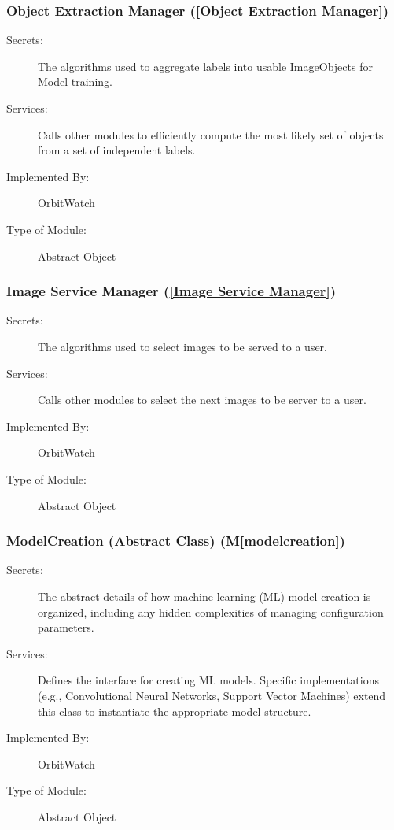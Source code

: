 \documentclass[12pt, titlepage]{article}
\newcommand{\mref}[1]{M\ref{#1}}
\begin{document}
\subsubsection{Object Extraction Manager (\ref{Object Extraction Manager})}
\begin{description}
\item[Secrets:] The algorithms used to aggregate labels into usable ImageObjects for Model training.
\item[Services:] Calls other modules to efficiently compute the most likely set of objects from a set of independent labels.
\item[Implemented By:] OrbitWatch
\item[Type of Module:] Abstract Object
\end{description}

\subsubsection{Image Service Manager (\ref{Image Service Manager})}
\begin{description}
\item[Secrets:] The algorithms used to select images to be served to a user.
\item[Services:] Calls other modules to select the next images to be server to a user.
\item[Implemented By:] OrbitWatch
\item[Type of Module:] Abstract Object
\end{description}

\subsubsection{ModelCreation (Abstract Class) (\mref{modelcreation})}
\begin{description}
  \item[Secrets:] 
    The abstract details of how machine learning (ML) model creation is organized,
    including any hidden complexities of managing configuration parameters.
  \item[Services:] 
    Defines the interface for creating ML models. Specific implementations 
    (e.g., Convolutional Neural Networks, Support Vector Machines) extend this class 
    to instantiate the appropriate model structure.
  \item[Implemented By:] 
    OrbitWatch
  \item[Type of Module:] 
    Abstract Object
\end{description}
\end{document}
